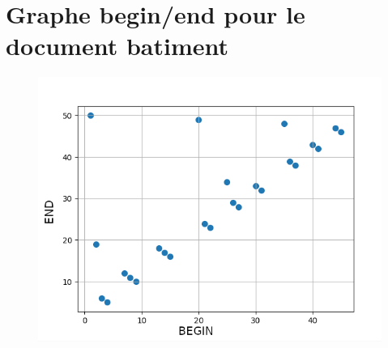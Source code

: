 \chapter{Graphe begin/end pour le document batiment}
\begin{figure}
  \includegraphics[width=\linewidth]{batiment_begin_end_graph.png}
\end{figure}

